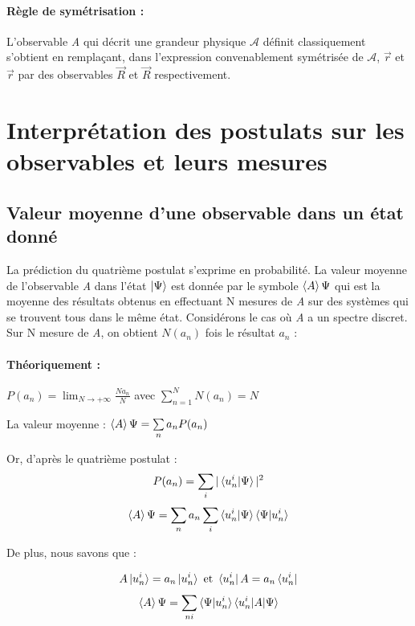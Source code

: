 \documentclass[12pt,a4paper,titlepage]{book}
\begin{document}
\paragraph*{Règle de symétrisation :}
L'observable \textit{A} qui décrit une grandeur physique $\mathcal{A}$ définit classiquement s'obtient en remplaçant, dans l'expression convenablement symétrisée de $\mathcal{A}$, $\overrightarrow{r}$ et $\overrightarrow{r}$ par des observables $\overrightarrow{R}$ et $\overrightarrow{R}$ respectivement.

\section{Interprétation des postulats sur les observables et leurs mesures}
\subsection{Valeur moyenne d'une observable dans un état donné}

La prédiction du quatrième postulat s'exprime en probabilité. La valeur moyenne de l'observable \textit{A} dans l'état $\ket\Psi$ est donnée par le symbole $\braket{A} \Psi$ qui est la moyenne des résultats obtenus en effectuant N mesures de \textit{A} sur des systèmes qui se trouvent tous dans le même état. Considérons le cas où \textit{A} a un spectre discret. Sur N mesure de \textit{A}, on obtient $N(a_n)$ fois le résultat $a_n$ :

\paragraph*{Théoriquement :}

$P(a_n) = \lim_{N \to +\infty} \frac{N a_n}{N}$ avec $\sum\limits_{n=1}^{N} N(a_n) = N$

La valeur moyenne : $\braket{A} \Psi = \sum\limits_n a_n P(a_n)$

Or, d'après le quatrième postulat :
\begin{equation*}
P(a_n) = \sum\limits_i \vert \braket{u_n^i | \Psi} \vert^2
\end{equation*}
\begin{equation*}
\braket{A} \Psi = \sum\limits_n a_n \sum\limits_i \braket{u_n^i | \Psi} \braket{\Psi | u_n^i}
\end{equation*}

De plus, nous savons que :

\begin{equation*}
A \ket{u_n^i} = a_n \ket{u_n^i} ~\text{et}~ \bra{u_n^i}A = a_n \bra{u_n^i}
\end{equation*}
\begin{equation*}
\braket{A} \Psi = \sum\limits_{n i} \braket{\Psi | u_n^i} \braket{u_n^i | A | \Psi}
\end{equation*}
\end{document}
